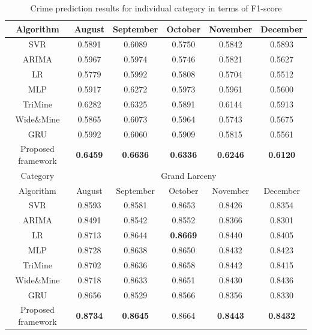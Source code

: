 \begin{table}
\begin{tabular}{c|c|c|c|c|c}
        \hline
        Algorithm & August & September & October & November & December \\[0.1cm]
        \hline
        SVR & 0.5891 & 0.6089 & 0.5750 & 0.5842 & 0.5893\\[0.1cm]
        ARIMA & 0.5967 & 0.5974 & 0.5746 & 0.5821 & 0.5627\\[0.1cm]
        LR & 0.5779 & 0.5992 & 0.5808 & 0.5704 & 0.5512\\[0.1cm]
        MLP & 0.5917 & 0.6272 & 0.5973 & 0.5961 & 0.5600\\[0.1cm]
        TriMine & 0.6282 & 0.6325 & 0.5891 & 0.6144 & 0.5913\\[0.1cm]
        Wide\&Mine & 0.5865 & 0.6073 & 0.5964 & 0.5743 & 0.5675\\[0.1cm]
        GRU & 0.5992 & 0.6060 & 0.5909 & 0.5815 & 0.5561\\[0.1cm]
        \toprule
        Proposed framework & \bf 0.6459 & \bf 0.6636 & \bf 0.6336 & \bf 0.6246 & \bf 0.6120\\
        \bottomrule
        \toprule
        Category &\multicolumn{5}{|c}{Grand Larceny}\\[0.1cm]
        \hline
        Algorithm & August & September & October & November & December \\[0.1cm]
        \hline
        SVR & 0.8593 & 0.8581 & 0.8653 & 0.8426 & 0.8354\\[0.1cm]
        ARIMA & 0.8491 & 0.8542 & 0.8552 & 0.8366 & 0.8301\\[0.1cm]
        LR & 0.8713 & 0.8644 & \bf 0.8669 & 0.8440 & 0.8405\\[0.1cm]
        MLP & 0.8728 & 0.8638 & 0.8650 & 0.8432 & 0.8423\\[0.1cm]
        TriMine & 0.8702 & 0.8636 & 0.8658 & 0.8442 & 0.8415\\[0.1cm]
        Wide\&Mine & 0.8718 & 0.8633 & 0.8651 & 0.8430 & 0.8436\\[0.1cm]
        GRU & 0.8656 & 0.8529 & 0.8566 & 0.8356 & 0.8330\\[0.1cm]
        \toprule
        Proposed framework & \bf 0.8734 & \bf 0.8645 & 0.8664 & \bf 0.8443 & \bf 0.8432\\
        \bottomrule
    \end{tabular}
    \caption{Crime prediction results for individual category in terms of F1-score}
    \label{table:category}
\end{table}
